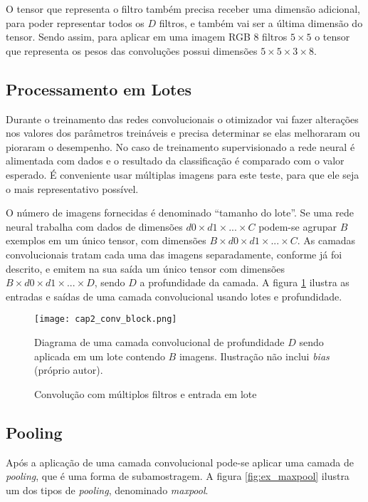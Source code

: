 O tensor que representa o filtro também precisa receber uma dimensão adicional,
para poder representar todos os $D$ filtros, e também vai ser a última dimensão
do tensor. Sendo assim, para aplicar em uma imagem RGB 8 filtros $5 \times 5$ o
tensor que representa os pesos das convoluções possui dimensões $5 \times 5
\times 3 \times 8$.

\subsection{Processamento em Lotes}
Durante o treinamento das redes convolucionais o otimizador vai fazer
alterações nos valores dos parâmetros treináveis e precisa determinar se elas
melhoraram ou pioraram o desempenho. No caso de treinamento supervisionado
a rede neural é alimentada com dados e o resultado da classificação é comparado
com o valor esperado. É conveniente usar múltiplas imagens para este teste,
para que ele seja o mais representativo possível.

O número de imagens fornecidas é denominado ``tamanho do lote''. Se uma rede
neural trabalha com dados de dimensões $d0 \times d1 \times ... \times C$
podem-se agrupar $B$ exemplos em
um único tensor, com dimensões $B \times d0 \times d1 \times ... \times C$.
As camadas convolucionais tratam cada uma das imagens separadamente,
conforme já foi descrito, e emitem na sua saída um
único tensor com dimensões $B \times d0 \times d1 \times ... \times D$, sendo
$D$ a profundidade da camada. A figura \ref{fig:cap2_conv_block} ilustra as
entradas e saídas de uma camada convolucional usando lotes e profundidade.

\begin{figure}[!htb]
	\centering
	\texttt{[image: cap2\_conv\_block.png]}
	\caption{Convolução com múltiplos filtros e entrada em lote}
	\label{fig:cap2_conv_block}
	Diagrama de uma camada convolucional de profundidade $D$ sendo aplicada em
	um lote contendo $B$ imagens. Ilustração não inclui \emph{bias}
	(próprio autor).
\end{figure}

\subsection{Pooling}
Após a aplicação de uma camada convolucional pode-se aplicar uma camada de
\emph{pooling}, que é uma forma de subamostragem. A figura
\ref{fig:ex_maxpool} ilustra um dos tipos de \emph{pooling}, denominado
\emph{maxpool}.

